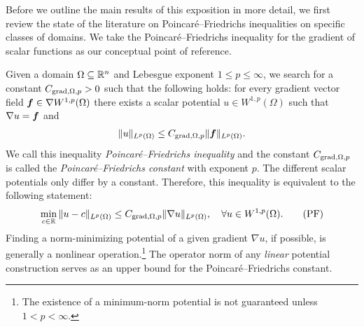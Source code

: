 \documentclass[10pt,letterpaper]{article}
\begin{document}
Before we outline the main results of this exposition in more detail, 
we first review the state of the literature on Poincar\'e--Friedrichs inequalities on specific classes of domains. 
We take the Poincar\'e--Friedrichs inequality for the gradient of scalar functions as our conceptual point of reference.

Given a domain $\Omega \subseteq {\mathbb R}^{n}$ and Lebesgue exponent $1 \leq p \leq \infty$,
we search for a constant $C_{\operatorname{grad},\Omega,p} > 0$ such that the following holds:
for every gradient vector field $\bm{f} \in \nabla W^{1,p}(\Omega)$ there exists a scalar potential $u \in W^{1,p}(\Omega)$
such that $\nabla u = \bm{f}$ and 
\begin{align}\label{math:intro:inequalitypf:gradient} 
    \| u \|_{L^{p}(\Omega)}
    \leq 
    C_{\operatorname{grad},\Omega,p} 
    \| \bm{f} \|_{L^{p}(\Omega)}
    .
\end{align}
We call this inequality \emph{Poincar\'e--Friedrichs inequality} and the constant $C_{\operatorname{grad},\Omega,p}$ is called the \emph{Poincar\'e--Friedrichs constant} with exponent $p$. 
The different scalar potentials only differ by a constant. 
Therefore, %
this inequality is equivalent to the following statement: 
\begin{align}\label{math:intro:poincarefriedrichs:grad}
    \min\limits_{c\in\bbR}
    \| u - c \|_{L^{p}(\Omega)}
    \leq 
    C_{\grad,\Omega,p} \| \nabla u \|_{L^{p}(\Omega)},
    \quad 
    \forall
    u \in W^{1,p}(\Omega) %
    .\tag{PF} 
\end{align}
Finding a norm-minimizing potential of a given gradient $\nabla u$, if possible, is generally a nonlinear operation.\footnote{The existence of a minimum-norm potential is not guaranteed unless $1 < p < \infty$.}
The operator norm of any \emph{linear} potential construction serves as an upper bound for the Poincar\'e--Friedrichs constant. 
\end{document}
